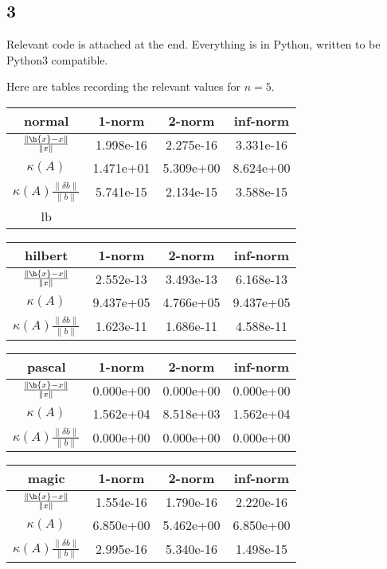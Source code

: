 \documentclass{article}
\begin{document}
\subsection*{3}
Relevant code is attached at the end. Everything is in Python, written to be Python3 compatible.

Here are tables recording the relevant values for $n=5$.

\vspace{10pt}
\begin{tabular}{c|c|c|c}
    normal&1-norm&2-norm&inf-norm\\
    \hline
        $\frac{\|\h{x}-x\|}{\|x\|}$&1.998e-16&2.275e-16&3.331e-16\\
        $\kappa(A)$&1.471e+01&5.309e+00&8.624e+00\\
        $\kappa(A)\frac{\|\delta b\|}{\|b\|}$&5.741e-15&2.134e-15&3.588e-15\\
lb\end{tabular}


\vspace{10pt}
\begin{tabular}{c|c|c|c}
        hilbert&1-norm&2-norm&inf-norm\\
        \hline
            $\frac{\|\h{x}-x\|}{\|x\|}$&2.552e-13&3.493e-13&6.168e-13\\
            $\kappa(A)$&9.437e+05&4.766e+05&9.437e+05\\
            $\kappa(A)\frac{\|\delta b\|}{\|b\|}$&1.623e-11&1.686e-11&4.588e-11\\
\end{tabular}


\vspace{10pt}
\begin{tabular}{c|c|c|c}
        pascal&1-norm&2-norm&inf-norm\\
        \hline
            $\frac{\|\h{x}-x\|}{\|x\|}$&0.000e+00&0.000e+00&0.000e+00\\
            $\kappa(A)$&1.562e+04&8.518e+03&1.562e+04\\
            $\kappa(A)\frac{\|\delta b\|}{\|b\|}$&0.000e+00&0.000e+00&0.000e+00\\
\end{tabular}


\vspace{10pt}
\begin{tabular}{c|c|c|c}
        magic&1-norm&2-norm&inf-norm\\
        \hline
            $\frac{\|\h{x}-x\|}{\|x\|}$&1.554e-16&1.790e-16&2.220e-16\\
            $\kappa(A)$&6.850e+00&5.462e+00&6.850e+00\\
            $\kappa(A)\frac{\|\delta b\|}{\|b\|}$&2.995e-16&5.340e-16&1.498e-15\\
\end{tabular}
\end{document}
